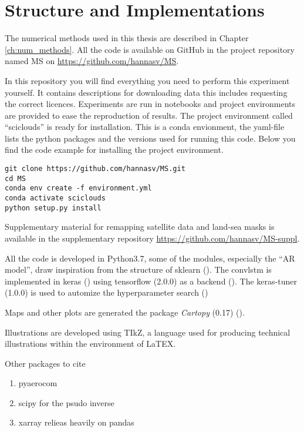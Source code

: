 \section{Structure and Implementations}
The numerical methods used in this thesis are described in Chapter \ref{ch:num_methods}. All the code is available on GitHub in the project repository named MS on \href{https://github.com/hannasv/MS}{https://github.com/hannasv/MS}. 

In this repository you will find everything you need to perform this experiment yourself. It contains descriptions for downloading data this includes requesting the correct licences. Experiments are run in notebooks and project environments are provided to ease the reproduction of results. The project environment called ``sciclouds'' is ready for installation. This is a conda envionment, the yaml-file lists the python packages and the versions used for running this code. Below you find the code example for installing the project environment.

\begin{verbatim}
git clone https://github.com/hannasv/MS.git
cd MS
conda env create -f environment.yml
conda activate sciclouds
python setup.py install
\end{verbatim}

Supplementary material for remapping satellite data and land-sea masks is available in the supplementary repository \href{https://github.com/hannasv/MS-suppl}{https://github.com/hannasv/MS-suppl}.

All the code is developed in Python3.7, some of the modules, especially the ``AR model'', draw inspiration from the structure of sklearn (\cite{sklearn_api}). The \acrshort{convlstm} is implemented in keras (\cite{chollet2015keras}) using tensorflow (2.0.0) as a backend (\cite{tensorflow2015}). The keras-tuner (1.0.0) is used to automize the hyperparameter search (\cite{chollet2015kerastuner})


Maps and other plots are generated the package \textit{Cartopy} (0.17) (\cite{Cartopy}). 

Illustrations are developed using TIkZ, a language used for producing technical illustrations within the environment of LaTEX.

Other packages to cite 
\begin{enumerate}
    \item pyaerocom 
    \item scipy for the psudo inverse
    \item xarray relieas heavily on pandas 
\end{enumerate}
